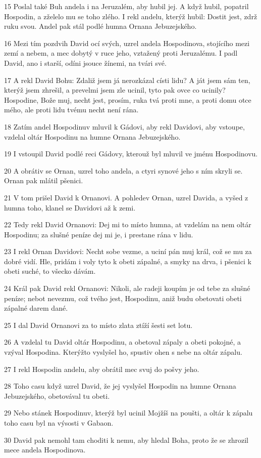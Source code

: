 \par 15 Poslal také Buh andela i na Jeruzalém, aby hubil jej. A když hubil, popatril Hospodin, a zželelo mu se toho zlého. I rekl andelu, kterýž hubil: Dostit jest, zdrž ruku svou. Andel pak stál podlé humna Ornana Jebuzejského.
\par 16 Mezi tím pozdvih David ocí svých, uzrel andela Hospodinova, stojícího mezi zemí a nebem, a mec dobytý v ruce jeho, vztažený proti Jeruzalému. I padl David, ano i starší, odíni jsouce žínemi, na tvári své.
\par 17 A rekl David Bohu: Zdaliž jsem já nerozkázal císti lidu? A ját jsem sám ten, kterýž jsem zhrešil, a prevelmi jsem zle ucinil, tyto pak ovce co ucinily? Hospodine, Bože muj, necht jest, prosím, ruka tvá proti mne, a proti domu otce mého, ale proti lidu tvému necht není rána.
\par 18 Zatím andel Hospodinuv mluvil k Gádovi, aby rekl Davidovi, aby vstoupe, vzdelal oltár Hospodinu na humne Ornana Jebuzejského.
\par 19 I vstoupil David podlé reci Gádovy, kterouž byl mluvil ve jménu Hospodinovu.
\par 20 A obrátiv se Ornan, uzrel toho andela, a ctyri synové jeho s ním skryli se. Ornan pak mlátil pšenici.
\par 21 V tom prišel David k Ornanovi. A pohledev Ornan, uzrel Davida, a vyšed z humna toho, klanel se Davidovi až k zemi.
\par 22 Tedy rekl David Ornanovi: Dej mi to místo humna, at vzdelám na nem oltár Hospodinu; za slušné peníze dej mi je, i prestane rána v lidu.
\par 23 I rekl Ornan Davidovi: Necht sobe vezme, a uciní pán muj král, což se mu za dobré vidí. Hle, pridám i voly tyto k obeti zápalné, a smyky na drva, i pšenici k obeti suché, to všecko dávám.
\par 24 Král pak David rekl Ornanovi: Nikoli, ale radeji koupím je od tebe za slušné peníze; nebot nevezmu, což tvého jest, Hospodinu, aniž budu obetovati obeti zápalné darem dané.
\par 25 I dal David Ornanovi za to místo zlata ztíží šesti set lotu.
\par 26 A vzdelal tu David oltár Hospodinu, a obetoval zápaly a obeti pokojné, a vzýval Hospodina. Kterýžto vyslyšel ho, spustiv ohen s nebe na oltár zápalu.
\par 27 I rekl Hospodin andelu, aby obrátil mec svuj do pošvy jeho.
\par 28 Toho casu když uzrel David, že jej vyslyšel Hospodin na humne Ornana Jebuzejského, obetovával tu obeti.
\par 29 Nebo stánek Hospodinuv, kterýž byl ucinil Mojžíš na poušti, a oltár k zápalu toho casu byl na výsosti v Gabaon.
\par 30 David pak nemohl tam choditi k nemu, aby hledal Boha, proto že se zhrozil mece andela Hospodinova.

